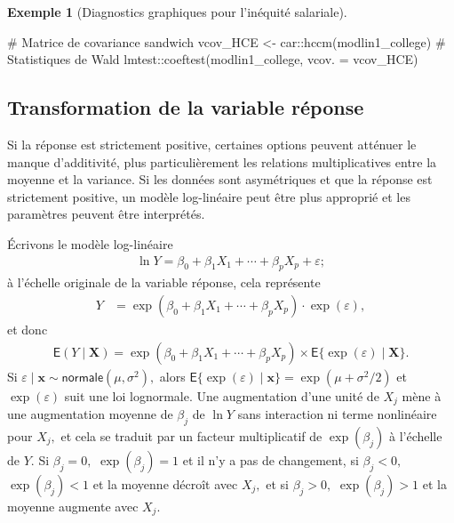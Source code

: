 \documentclass[
  11pt,
  letterpaper,
]{scrbook}
\newenvironment{Shaded}{\begin{snugshade}}{\end{snugshade}}
\newcommand{\AttributeTok}[1]{\textcolor[rgb]{0.40,0.45,0.13}{#1}}
\newcommand{\CommentTok}[1]{\textcolor[rgb]{0.37,0.37,0.37}{#1}}
\newcommand{\FunctionTok}[1]{\textcolor[rgb]{0.28,0.35,0.67}{#1}}
\newcommand{\NormalTok}[1]{\textcolor[rgb]{0.00,0.23,0.31}{#1}}
\newcommand{\OtherTok}[1]{\textcolor[rgb]{0.00,0.23,0.31}{#1}}
\newcommand{\SpecialCharTok}[1]{\textcolor[rgb]{0.37,0.37,0.37}{#1}}
\theoremstyle{plain}
\theoremstyle{plain}
\theoremstyle{definition}
\newtheorem{example}{Exemple}[chapter]
\theoremstyle{definition}
\theoremstyle{remark}
\begin{document}
\begin{example}[Diagnostics graphiques pour l'inéquité
salariale]
\begin{Shaded}
\begin{Highlighting}[]
\CommentTok{\# Matrice de covariance sandwich}
\NormalTok{vcov\_HCE }\OtherTok{\textless{}{-}}\NormalTok{ car}\SpecialCharTok{::}\FunctionTok{hccm}\NormalTok{(modlin1\_college)}
\CommentTok{\# Statistiques de Wald}
\NormalTok{lmtest}\SpecialCharTok{::}\FunctionTok{coeftest}\NormalTok{(modlin1\_college, }\AttributeTok{vcov. =}\NormalTok{ vcov\_HCE)}
\end{Highlighting}
\end{Shaded}

\end{example}

\subsection{Transformation de la variable réponse}\label{sec-transfo}

Si la réponse est strictement positive, certaines options peuvent
atténuer le manque d'additivité, plus particulièrement les relations
multiplicatives entre la moyenne et la variance. Si les données sont
asymétriques et que la réponse est strictement positive, un modèle
log-linéaire peut être plus approprié et les paramètres peuvent être
interprétés.

Écrivons le modèle log-linéaire \begin{align*}
\ln Y = \beta_0+ \beta_1 X_1 +\cdots + \beta_pX_p + \varepsilon;
\end{align*} à l'échelle originale de la variable réponse, cela
représente \begin{align*}
Y &= \exp\left(\beta_0 +\beta_1 X_1 +\cdots + \beta_pX_p\right)\cdot \exp(\varepsilon),
\end{align*} et donc \begin{align*}
\mathsf{E}(Y \mid \mathbf{X}) = \exp(\beta_0 +\beta_1 X_1 +\cdots + \beta_pX_p) \times \mathsf{E}\{\exp(\varepsilon) \mid \mathbf{X}\}.
\end{align*} Si
\(\varepsilon \mid \mathbf{x} \sim \mathsf{normale}(\mu,\sigma^2),\)
alors
\(\mathsf{E}\{\exp(\varepsilon) \mid \mathbf{x}\}= \exp(\mu+\sigma^2/2)\)
et \(\exp(\varepsilon)\) suit une loi lognormale. Une augmentation d'une
unité de \(X_j\) mène à une augmentation moyenne de \(\beta_j\) de
\(\ln Y\) sans interaction ni terme nonlinéaire pour \(X_j,\) et cela se
traduit par un facteur multiplicatif de \(\exp(\beta_j)\) à l'échelle de
\(Y.\) Si \(\beta_j=0,\) \(\exp(\beta_j)=1\) et il n'y a pas de
changement, si \(\beta_j < 0,\) \(\exp(\beta_j)<1\) et la moyenne
décroît avec \(X_j,\) et si \(\beta_j > 0,\) \(\exp(\beta_j)>1\) et la
moyenne augmente avec \(X_j.\)
\end{document}
